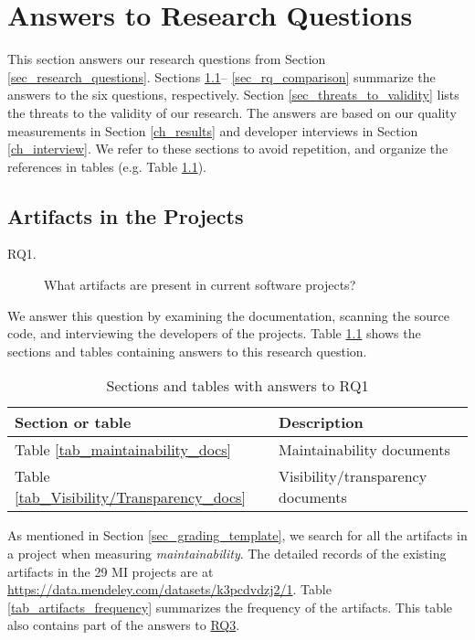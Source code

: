 \chapter{Answers to Research Questions}
\label{ch_answers}

This section answers our research questions from Section \ref{sec_research_questions}.  Sections \ref{sec_rq_artifacts}-- \ref{sec_rq_comparison} summarize the answers to the six questions, respectively. Section \ref{sec_threats_to_validity} lists the threats to the validity of our research. The answers are based on our quality measurements in Section \ref{ch_results} and developer interviews in Section \ref{ch_interview}. We refer to these sections to avoid repetition, and organize the references in tables (e.g. Table \ref{tab_reference_rq1}).

\section{Artifacts in the Projects}
\label{sec_rq_artifacts}
\begin{description}
\item[RQ1.] What artifacts are present in current software projects?
\end{description}

We answer this question by examining the documentation, scanning the source code, and interviewing the developers of the projects. Table \ref{tab_reference_rq1} shows the sections and tables containing answers to this research question.

\begin{table}[H]
\centering
\begin{tabular}{ll}
\hline
Section or table & Description \\ \hline
Table \ref{tab_maintainability_docs} & Maintainability documents \\
Table \ref{tab_Visibility/Transparency_docs} & Visibility/transparency documents \\ \hline
\end{tabular}
\caption{\label{tab_reference_rq1}Sections and tables with answers to RQ1}
\end{table}

As mentioned in Section \ref{sec_grading_template}, we search for all the artifacts in a project when measuring \textit{maintainability}. The detailed records of the existing artifacts in the 29 MI projects are at \hyperlink{https://data.mendeley.com/datasets/k3pcdvdzj2/1}{https://data.mendeley.com/datasets/k3pcdvdzj2/1}. Table \ref{tab_artifacts_frequency} summarizes the frequency of the artifacts. This table also contains part of the answers to \hyperlink{rq3}{RQ3}.

